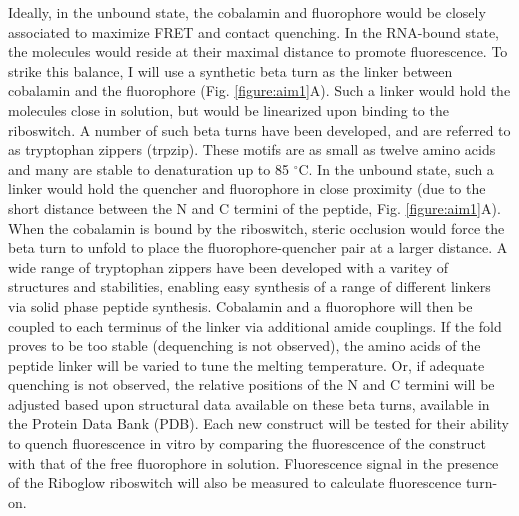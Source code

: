 Ideally, in the unbound state, the cobalamin and fluorophore would be closely associated to maximize FRET and contact quenching.\cite{RosendahlSynthesisbiologicalactivity1982,ShellVitaminB12Tunable2015,ShellTunableVisibleNearIR2014}
In the RNA-bound state, the molecules would reside at their maximal distance to promote fluorescence.\cite{LeeDesignSynthesisCharacterization2009}
To strike this balance, I will use a synthetic beta turn as the linker between cobalamin and the fluorophore (Fig. \ref{figure:aim1}A).
Such a linker would hold the molecules close in solution, but would be linearized upon binding to the riboswitch.
A number of such beta turns have been developed, and are referred to as tryptophan zippers (trpzip).\cite{CochranTryptophanzippersStable2001}
These motifs are as small as twelve amino acids and many are stable to denaturation up to 85 $^\circ$C.
In the unbound state, such a linker would hold the quencher and fluorophore in close proximity (due to the short distance between the N and C termini of the peptide, Fig. \ref{figure:aim1}A).
When the cobalamin is bound by the riboswitch, steric occlusion would force the beta turn to unfold to place the fluorophore-quencher pair at a larger distance.
A wide range of tryptophan zippers have been developed with a varitey of structures and stabilities, enabling easy synthesis of a range of different linkers via solid phase peptide synthesis.\cite{CochranTryptophanzippersStable2001,KierProbingLowerSize2008,AndersenMinimizationOptimizationDesigned2006}
Cobalamin and a fluorophore will then be coupled to each terminus of the linker via additional amide couplings.\cite{JackowskaVitaminB12derivatives2018}
If the fold proves to be too stable (dequenching is not observed), the amino acids of the peptide linker will be varied to tune the melting temperature.
Or, if adequate quenching is not observed, the relative positions of the N and C termini will be adjusted based upon structural data available on these beta turns, available in the Protein Data Bank (PDB).
Each new construct will be tested for their ability to quench fluorescence in vitro by comparing the fluorescence of the construct with that of the free fluorophore in solution. Fluorescence signal in the presence of the Riboglow riboswitch will also be measured to calculate fluorescence turn-on.

